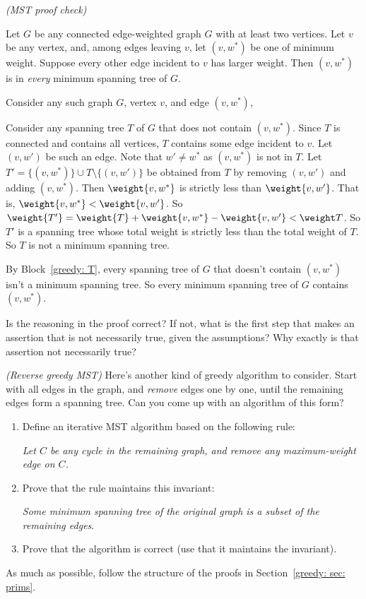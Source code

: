 \exercise\label{greedy: exercise: MST proof check}\emph{(MST proof check)}
\begin{conjecture}
  Let $G$ be any connected edge-weighted graph $G$ with at least two vertices.
  Let $v$ be any vertex,
  and, among edges leaving $v$,
  let $(v, w^*)$ be one of minimum weight.
  Suppose every other edge incident to $v$ has larger weight.
  Then $(v,w^*)$ is in \emph{every} minimum spanning tree of $G$.
\end{conjecture}
\begin{longFormProof}
  \step Consider any such graph $G$, vertex $v$, and edge $(v,w^*)$,
  \begin{block}[greedy: T]
    \step Consider any spanning tree $T$ of $G$ that does not contain $(v,w^*)$.
    \step Since $T$ is connected and contains all vertices, $T$ contains some edge incident to $v$.
    \step Let $(v, w')$ be such an edge.  Note that $w' \ne w^*$ as $(v, w^*)$ is not in $T$.
    \step Let $T' = \{(v, w^*)\} \cup T \setminus \{(v, w')\}$ be obtained from $T$ by removing $(v, w')$ and adding $(v, w^*)$.
    \step Then $\weight{v, w^*}$ is strictly less than $\weight{v, w'}$.  That is, $\weight{v, w^*} < \weight{v, w'}$.  
    \step So $\weight{T'} = \weight{T} + \weight{v, w^*} - \weight{v, w'} < \weight T$.
    \step So $T'$ is a spanning tree whose total weight is strictly less than the total weight of $T$.
    \step So $T$ is not a minimum spanning tree.
  \end{block}
  \step By Block~\ref{greedy: T}, every spanning tree of $G$ that doesn't contain $(v, w^*)$ isn't a minimum spanning tree. 
  \step So every minimum spanning tree of $G$ contains $(v, w^*)$.
\end{longFormProof}

Is the reasoning in the proof correct?
If not, what is the first step that makes an assertion that is not necessarily true,
given the assumptions?
Why exactly is that assertion not necessarily true?

\exercise\label{greedy: exercise: reverse greedy MST}\emph{(Reverse greedy MST)}
Here's another kind of greedy algorithm to consider.
Start with all edges in the graph,
and \emph{remove} edges one by one,
until the remaining edges form a spanning tree.
Can you come up with an algorithm of this form?

\begin{enumerate}[label=(\alph*)]
\item Define an iterative MST algorithm based on the following rule:

  \emph{Let $C$ be any cycle in the remaining graph,
    and remove any maximum-weight edge on $C$.}

\item Prove that the rule maintains this invariant: 

  \emph{Some minimum spanning tree of the original graph
    is a subset of the remaining edges}.

\item  Prove that the algorithm is correct (use that it maintains the invariant).
\end{enumerate}
As much as possible, follow the structure of the proofs in Section~\ref{greedy: sec: prims}.


